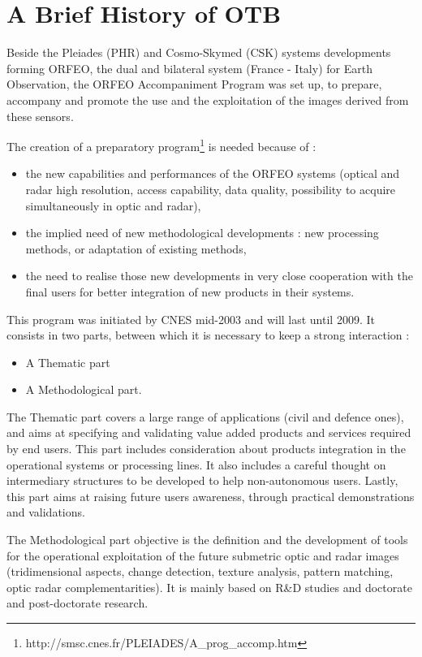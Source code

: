 \section{A Brief History of OTB}
\label{sec:History}



Beside the Pleiades (PHR) and Cosmo-Skymed (CSK) systems developments forming ORFEO, the dual and bilateral system (France - Italy) for Earth Observation, the ORFEO Accompaniment Program was set up, to prepare, accompany and promote the use and the exploitation of the images derived from these sensors.

The creation of a preparatory program\footnote{http://smsc.cnes.fr/PLEIADES/A\_prog\_accomp.htm} is needed because of :
\begin{itemize}
\item the new capabilities and performances of the ORFEO systems (optical and radar high resolution, access capability, data quality, possibility to acquire simultaneously in optic and radar),
\item the implied need of new methodological developments : new processing methods, or adaptation of existing methods,
\item the need to realise those new developments in very close
  cooperation with the final users for better integration of new products in their systems.
  
\end{itemize}

This program was initiated by CNES mid-2003 and will last until 2009.
It consists in two parts, between which it is necessary to keep a strong interaction :
\begin{itemize}
\item A Thematic part
\item A Methodological part.
\end{itemize}

The Thematic part covers a large range of applications (civil and
defence ones), and aims at specifying and validating value added
products and services required by end users. This part includes
consideration about products integration in the operational systems or
processing lines. It also includes a careful thought on intermediary
structures to be developed to help non-autonomous users. Lastly, this part aims at raising future users awareness, through practical demonstrations and validations.

The Methodological part objective is the definition and the
development of tools for the operational exploitation of the future
submetric optic and radar images (tridimensional aspects, change
detection, texture analysis, pattern matching, optic radar
complementarities). It is mainly based on R\&D studies and doctorate
and post-doctorate research.

